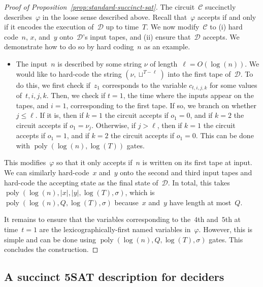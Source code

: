 \documentclass[11pt]{article}
\theoremstyle{definition}
\DeclareMathOperator{\poly}{poly}
\newcommand{\decider}{\mathcal{D}}
\newcommand{\circuit}{\mathcal{C}}
\begin{document}
\begin{proof}[Proof of Proposition~\ref{prop:standard-succinct-sat}]
The circuit~$\circuit$ succinctly describes~$\varphi$ in the loose sense
described above.
Recall that~$\varphi$ accepts if and only if it encodes the execution
of~$\decider$ up to time~$T$.
We now modify~$\circuit$ to (i) hard code~$n$, $x$, and~$y$ onto~$\decider$'s
input tapes, and (ii) ensure that~$\decider$ accepts.
We demonstrate how to do so by hard coding~$n$ as an example.
\begin{itemize}
\item The input~$n$ is described by some string $\nu$ of length~$\ell =
  O(\log(n))$.
	We would like to hard-code the string $(\nu, \sqcup^{T - \ell})$ into the
  first tape of~$\decider$.
	To do this, we first check if~$z_1$ corresponds to the variable $c_{t, i, j,
    k}$ for some values of~$t, i, j, k$.
	Then, we check if $t = 1$, the time where the inputs appear on the tapes, and
  $i = 1$, corresponding to the first tape.
	If so, we branch on whether $j \leq \ell$.
	If it is, then if $k = 1$ the circuit accepts if $o_1 = 0$, and if $k = 2$ the
  circuit accepts if $o_1 = \nu_j$.
	Otherwise, if $j > \ell$, then if $k = 1$ the circuit accepts if $o_1 = 1$,
  and if $k = 2$ the circuit accepts if $o_1 = 0$.
	This can be done with $\poly(\log(n), \log(T))$ gates.
\end{itemize}
This modifies~$\varphi$ so that it only accepts if~$n$ is written on its first
tape at input.
We can similarly hard-code~$x$ and~$y$ onto the second and third input tapes and
hard-code the accepting state as the final state of~$\decider$.
In total, this takes $\poly(\log(n), |x|, |y|, \log(T), \sigma)$, which is
$\poly(\log(n), Q, \log(T), \sigma)$ because~$x$ and~$y$ have length at
most~$Q$.

It remains to ensure that the variables corresponding to the~$4$th and~$5$th at
time~$t = 1$ are the lexicographically-first named variables in~$\varphi$.
However, this is simple and can be done using $\poly(\log(n), Q, \log(T),
\sigma)$ gates.
This concludes the construction.
\end{proof}

\subsection{A succinct 5SAT description for deciders}
\label{sec:succinct-deciders}
\end{document}
